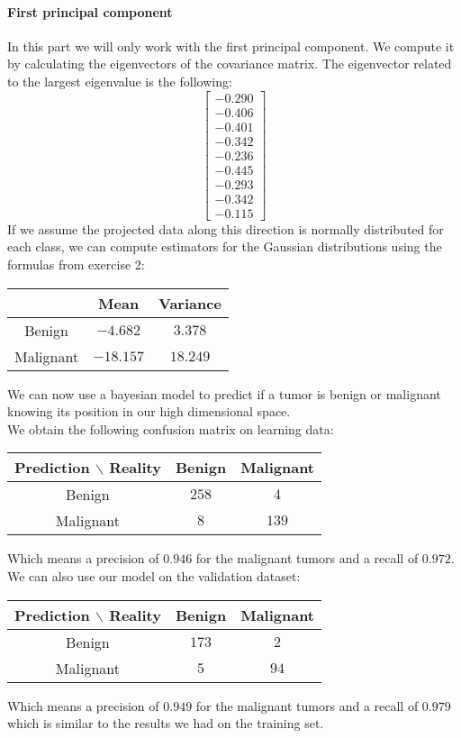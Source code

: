 \documentclass[a4paper, 10pt]{article}
\begin{document}
\paragraph{First principal component}
In this part we will only work with the first principal component. We compute it by calculating the
eigenvectors of the covariance matrix. The eigenvector related to the largest eigenvalue is the following:
$$
\begin{bmatrix}
    -0.290\\
    -0.406\\
    -0.401\\
    -0.342\\
    -0.236\\
    -0.445\\
    -0.293\\
    -0.342\\
    -0.115
\end{bmatrix}
$$
If we assume the projected data along this direction is normally distributed for each class, we can compute
estimators for the Gaussian distributions using the formulas from exercise 2:
\begin{center}
    \begin{tabular}{ |c|c|c| }
        \hline
        \ & Mean & Variance \\
        \hline
        Benign & $-4.682$ & $3.378$ \\
        \hline
        Malignant & $-18.157$ & $18.249$ \\ 
        \hline
    \end{tabular}
\end{center}
We can now use a bayesian model to predict if a tumor is benign or malignant knowing its position in our high dimensional space.
\\
We obtain the following confusion matrix on learning data:
\begin{center}
    \begin{tabular}{ |c|c|c| }
        \hline
        Prediction $\backslash$ Reality & Benign & Malignant \\
        \hline
        Benign & $258$ & $4$ \\
        \hline
        Malignant & $8$ & $139$ \\ 
        \hline
    \end{tabular}
\end{center}
Which means a precision of $0.946$ for the malignant tumors and a recall of $0.972$.
\\
We can also use our model on the validation dataset:
\begin{center}
    \begin{tabular}{ |c|c|c| }
        \hline
        Prediction $\backslash$ Reality & Benign & Malignant \\
        \hline
        Benign & $173$ & $2$ \\
        \hline
        Malignant & $5$ & $94$ \\ 
        \hline
    \end{tabular}
\end{center}
Which means a precision of $0.949$ for the malignant tumors and a recall of $0.979$ which is similar to
the results we had on the training set.
\end{document}

